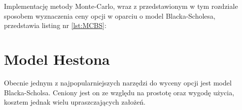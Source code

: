 \documentclass{pracamgr}
\begin{document}
Implementację metody Monte-Carlo, wraz z przedstawionym w tym rozdziale sposobem wyznaczenia 
ceny opcji w oparciu o model Blacka-Scholesa, przedstawia listing nr \ref{lst:MCBS}:




 




%
%
\chapter{Model Hestona}
\label{chap:hestonModel}




Obecnie jednym z najpopularniejszych narzędzi do wyceny opcji jest model Blacka-Scholsa. Ceniony jest on ze względu na prostotę oraz wygodę użycia, kosztem jednak wielu upraszczających założeń. 
\end{document}
